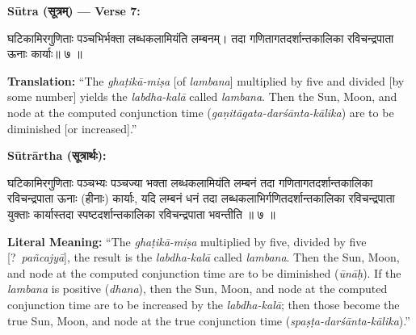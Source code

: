\documentclass[11pt,a4paper]{article}
\newcommand{\dev}[1]{{\devanagarifont #1}}
\newenvironment{sanskritverse}{%
  \begin{center}\begin{minipage}{0.95\textwidth}
  \setlength{\leftskip}{1em}
  \setlength{\rightskip}{1em}
  \dev
}{\end{minipage}\end{center}}
\newenvironment{paracol}[1]{\begingroup}{\endgroup}
\newcommand{\switchcolumn}[1][]{%
  \ifnum#1=0\relax\else\par\nobreak\vspace{0.5em}\par\nobreak\fi%
}
\begin{document}
\vspace{0.5em}
\noindent\textbf{Sūtra ({\devanagarifont सूत्रम्}) — Verse 7:}

\begin{paracol}{2}

\begin{sanskritverse}
घटिकामिरगुणिताः पञ्चभिर्भक्ता लब्धकलामियंति लम्बनम्।
तदा गणितागतदर्शान्तकालिका रविचन्द्रपाता ऊनाः कार्याः॥ ७ ॥
\end{sanskritverse}

\switchcolumn

\textbf{Translation:} ``The \textit{ghaṭikā-miṣa} [of \textit{lambana}] multiplied by five and divided [by some number] yields the \textit{labdha-kalā} called \textit{lambana}. Then the Sun, Moon, and node at the computed conjunction time (\textit{gaṇitāgata-darśānta-kālika}) are to be diminished [or increased].''

\end{paracol}

\vspace{0.5em}

\begin{paracol}{2}

\noindent\textbf{Sūtrārtha (\dev{सूत्रार्थः}):}
\begin{sanskritverse}
घटिकामिरगुणिताः पञ्चभ्यः पञ्चज्या भक्ता लब्धकलामियंति लम्बनं तदा
गणितागतदर्शान्तकालिका रविचन्द्रपाता ऊनाः (हीनाः) कार्याः, यदि लम्बनं धनं तदा
लब्धकलाभिर्गणितदर्शान्तकालिका रविचन्द्रपाता युक्ताः कार्यास्तदा स्पष्टदर्शान्तकालिका
रविचन्द्रपाता भवन्तीति ॥ ७ ॥
\end{sanskritverse}

\switchcolumn

\textbf{Literal Meaning:} ``The \textit{ghaṭikā-miṣa} multiplied by five, divided by five [?\ \textit{pañcajyā}], the result is the \textit{labdha-kalā} called \textit{lambana}. Then the Sun, Moon, and node at the computed conjunction time are to be diminished (\textit{ūnāḥ}). If the \textit{lambana} is positive (\textit{dhana}), then the Sun, Moon, and node at the computed conjunction time are to be increased by the \textit{labdha-kalā}; then those become the true Sun, Moon, and node at the true conjunction time (\textit{spaṣṭa-darśānta-kālika}).''

\end{paracol}
\end{document}
